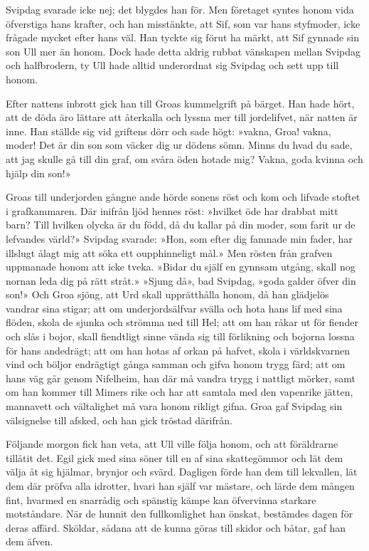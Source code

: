 Svipdag svarade icke nej; det blygdes han för. Men företaget syntes
honom vida öfverstiga hans krafter, och han misstänkte, att Sif, som var
hans styfmoder, icke frågade mycket efter hans väl. Han tyckte sig förut
ha märkt, att Sif gynnade sin son Ull mer än honom. Dock hade detta
aldrig rubbat vänskapen mellan Svipdag och halfbrodern, ty Ull hade
alltid underordnat sig Svipdag och sett upp till honom.

Efter nattens inbrott gick han till Groas kummelgrift på bärget. Han
hade hört, att de döda äro lättare att återkalla och lyssna mer till
jordelifvet, när natten är inne. Han ställde sig vid griftens dörr och
sade högt: »vakna, Groa! vakna, moder! Det är din son som väcker dig ur
dödens sömn. Minns du hvad du sade, att jag skulle gå till din graf, om
svåra öden hotade mig? Vakna, goda kvinna och hjälp din son!»

Groas till underjorden gångne ande hörde sonens röst och kom och lifvade
stoftet i grafkammaren. Där inifrån ljöd hennes röst: »hvilket öde har
drabbat mitt barn? Till hvilken olycka är du född, då du kallar på din
moder, som farit ur de lefvandes värld?» Svipdag svarade: »Hon, som
efter dig famnade min fader, har illslugt ålagt mig att söka ett
oupphinneligt mål.» Men rösten från grafven uppmanade
\protect\hypertarget{lb1625905.xhtmlux5cux23start106}{}{}\protect\hypertarget{lb1625905.xhtmlux5cux23start106-a}{}{}\protect\hypertarget{lb1625905.xhtmlux5cux23start106-b}{}{}\protect\hypertarget{lb1625905.xhtmlux5cux23start106-c}{}{}\protect\hypertarget{lb1625905.xhtmlux5cux23start106-d}{}{}
honom att icke tveka. »Bidar du själf en gynnsam utgång, skall nog
nornan leda dig på rätt stråt.» »Sjung då», bad Svipdag, »goda galder
öfver din son!» Och Groa sjöng, att Urd skall upprätthålla honom, då han
glädjelös vandrar sina stigar; att om underjordsälfvar svälla och hota
hans lif med sina flöden, skola de sjunka och strömma ned till Hel; att
om han råkar ut för fiender och slås i bojor, skall fiendtligt sinne
vända sig till förlikning och bojorna lossna för hans andedrägt; att om
han hotas af orkan på hafvet, skola i världskvarnen vind och böljor
endrägtigt gånga samman och gifva honom trygg färd; att om hans väg går
genom Nifelheim, han där må vandra trygg i nattligt mörker, samt om han
kommer till Mimers rike och har att samtala med den vapenrike jätten,
mannavett och vältalighet må vara honom rikligt gifna. Groa gaf Svipdag
sin välsignelse till afsked, och han gick tröstad därifrån.

Följande morgon fick han veta, att Ull ville följa honom, och att
föräldrarne tillåtit det. Egil gick med sina söner till en af sina
skattegömmor och lät dem välja åt sig hjälmar, brynjor och svärd.
Dagligen förde han dem till lekvallen, lät dem där pröfva alla idrotter,
hvari han själf var mästare, och lärde dem mången fint, hvarmed en
snarrådig och spänstig kämpe kan öfvervinna starkare motståndare. När de
hunnit den fullkomlighet han önskat, bestämdes dagen för deras affärd.
Sköldar, sådana att de kunna göras till skidor och båtar, gaf han dem
äfven.

